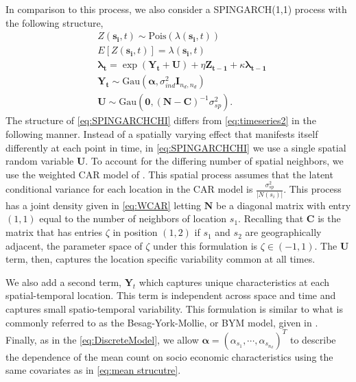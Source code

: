 \documentclass[11pt]{isuthesis}
\begin{document}
In comparison to this process, we also consider a SPINGARCH(1,1) process with the following structure,
\begin{align}
	& Z(\boldsymbol{s_i},t) \sim \mbox{Pois}(\lambda(\boldsymbol{s_i},t)) \label{eq:SPINGARCHCHI} \\
	& E[Z(\boldsymbol{s_i},t)]=\lambda(\boldsymbol{s_i},t)\nonumber\\
	& \boldsymbol{\lambda_t} = \exp(\boldsymbol{Y_t}+\boldsymbol{U})+\eta \boldsymbol{Z_{t-1}}+\kappa \boldsymbol{\lambda_{t-1}}\nonumber\\
	& \boldsymbol{Y_t} \sim \mbox{Gau}\textit{} (\boldsymbol{\alpha},\sigma_{ind}^2 \boldsymbol{I}_{{n_d},{n_d}})\nonumber\\
	& \boldsymbol{U} \sim \mbox{Gau} (\boldsymbol{0},(\boldsymbol{N}-\boldsymbol{C})^{-1}\sigma_{sp}^2)\label{eq:WCAR}.
\end{align}
The structure of \eqref{eq:SPINGARCHCHI} differs from \eqref{eq:timeseries2} in the following manner.  Instead of a spatially varying effect that manifests itself differently at each point in time, in \eqref{eq:SPINGARCHCHI} we use a single spatial random variable $\boldsymbol{U}$.  To account for the differing number of spatial neighbors, we use the weighted CAR model of \cite{besag1991bayesian}.  This spatial process assumes that the latent conditional variance for each location in the CAR model is $\frac{\sigma^2_{sp}}{|N(s_i)|}$.  This process has a joint density given in \eqref{eq:WCAR} letting $\boldsymbol{N}$ be a diagonal matrix with entry $(1,1)$ equal to the number of neighbors of location $s_1$.  Recalling that $\boldsymbol{C}$ is the matrix that has entries $\zeta$ in position $(1,2)$ if $s_1$ and $s_2$ are geographically adjacent, the parameter space of $\zeta$ under this formulation is $\zeta \in (-1,1)$.  The $\boldsymbol{U}$ term, then, captures the location specific variability common at all times.

We also add a second term, $\boldsymbol{Y}_t$ which captures unique characteristics at each spatial-temporal location.  This term is independent across space and time and captures small spatio-temporal variability.  This formulation is similar to what is commonly referred to as the Besag-York-Mollie, or BYM model, given in \cite{besag1991bayesian}.  Finally, as in the \eqref{eq:DiscreteModel}, we allow $\boldsymbol{\alpha}=(\alpha_{s_1},\cdots,\alpha_{s_{n_d}})^T$ to describe the dependence of the mean count on socio economic characteristics using the same covariates as in \eqref{eq:mean strucutre}.
\end{document}
